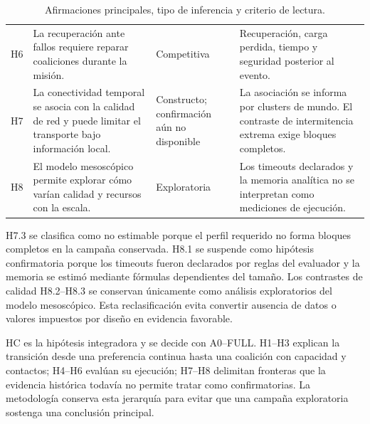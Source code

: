 \begin{table}[H]
\begin{tabularx}{\textwidth}{@{}p{}p{}p{}X@{}}
H6 & La recuperación ante fallos requiere reparar coaliciones durante la misión. & Competitiva & Recuperación, carga perdida, tiempo y seguridad posterior al evento. \\
H7 & La conectividad temporal se asocia con la calidad de red y puede limitar el transporte bajo información local. & Constructo; confirmación aún no disponible & La asociación se informa por clusters de mundo. El contraste de intermitencia extrema exige bloques completos. \\
H8 & El modelo mesoscópico permite explorar cómo varían calidad y recursos con la escala. & Exploratoria & Los timeouts declarados y la memoria analítica no se interpretan como mediciones de ejecución. \\
\bottomrule
\end{tabularx}
\caption{Afirmaciones principales, tipo de inferencia y criterio de lectura.}
\label{tab:hipotesis-principales}
\end{table}

H7.3 se clasifica como no estimable porque el perfil requerido no forma bloques completos en la campaña conservada. H8.1 se suspende como hipótesis confirmatoria porque los timeouts fueron declarados por reglas del evaluador y la memoria se estimó mediante fórmulas dependientes del tamaño. Los contrastes de calidad H8.2--H8.3 se conservan únicamente como análisis exploratorios del modelo mesoscópico. Esta reclasificación evita convertir ausencia de datos o valores impuestos por diseño en evidencia favorable.

HC es la hipótesis integradora y se decide con A0--FULL. H1--H3 explican la transición desde una preferencia continua hasta una coalición con capacidad y contactos; H4--H6 evalúan su ejecución; H7--H8 delimitan fronteras que la evidencia histórica todavía no permite tratar como confirmatorias. La metodología conserva esta jerarquía para evitar que una campaña exploratoria sostenga una conclusión principal.
